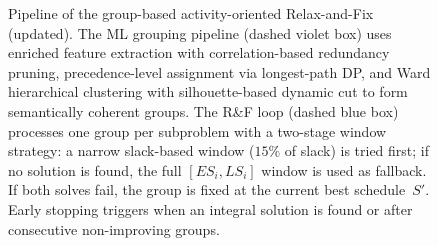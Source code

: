 \begin{figure}[p]
{}
\caption{Pipeline of the group-based activity-oriented Relax-and-Fix
         (updated).
         The ML grouping pipeline (dashed violet box) uses enriched
         feature extraction with correlation-based redundancy pruning,
         precedence-level assignment via longest-path DP, and Ward
         hierarchical clustering with silhouette-based dynamic cut
         to form semantically coherent groups.
         The R\&F loop (dashed blue box) processes one group per
         subproblem with a two-stage window strategy: a narrow
         slack-based window ($15\%$ of slack) is tried first;
         if no solution is found, the full $[ES_i, LS_i]$ window
         is used as fallback.  If both solves fail, the group is
         fixed at the current best schedule~$S'$.
         Early stopping triggers when an integral solution is found
         or after consecutive non-improving groups.}
\label{fig:grouprf_pipeline}
\vspace*{\fill}
\end{figure}
